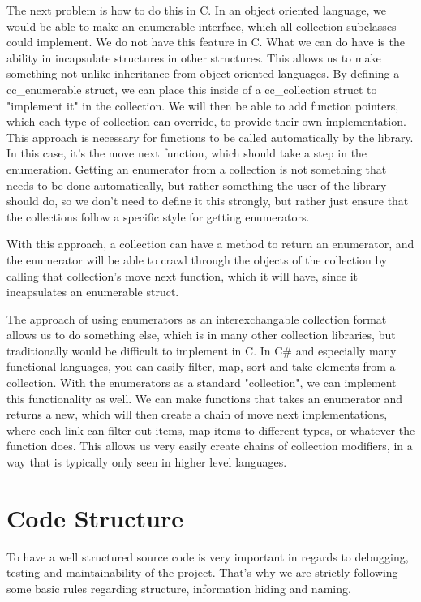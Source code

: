 \documentclass[table]{ituthesis}
\begin{document}
The next problem is how to do this in C. In an object oriented language, we would be able to make an enumerable interface, which all collection subclasses could implement. We do not have this feature in C. What we can do have is the ability in incapsulate structures in other structures. This allows us to make something not unlike inheritance from object oriented languages. By defining a cc\_enumerable struct, we can place this inside of a cc\_collection struct to "implement it" in the collection. We will then be able to add function pointers, which each type of collection can override, to provide their own implementation. This approach is necessary for functions to be called automatically by the library. In this case, it's the move next function, which should take a step in the enumeration. Getting an enumerator from a collection is not something that needs to be done automatically, but rather something the user of the library should do, so we don't need to define it this strongly, but rather just ensure that the collections follow a specific style for getting enumerators.

With this approach, a collection can have a method to return an enumerator, and the enumerator will be able to crawl through the objects of the collection by calling that collection's move next function, which it will have, since it incapsulates an enumerable struct.

The approach of using enumerators as an interexchangable collection format allows us to do something else, which is in many other collection libraries, but traditionally would be difficult to implement in C. In C\# and especially many functional languages, you can easily filter, map, sort and take elements from a collection. With the enumerators as a standard "collection", we can implement this functionality as well. We can make functions that takes an enumerator and returns a new, which will then create a chain of move next implementations, where each link can filter out items, map items to different types, or whatever the function does. This allows us very easily create chains of collection modifiers, in a way that is typically only seen in higher level languages.

\section{Code Structure}\label{sec:arch_code_structure}

To have a well structured source code is very important in regards to debugging, testing and maintainability of the project. That's why we are strictly following some basic rules regarding structure, information hiding and naming.
\end{document}
